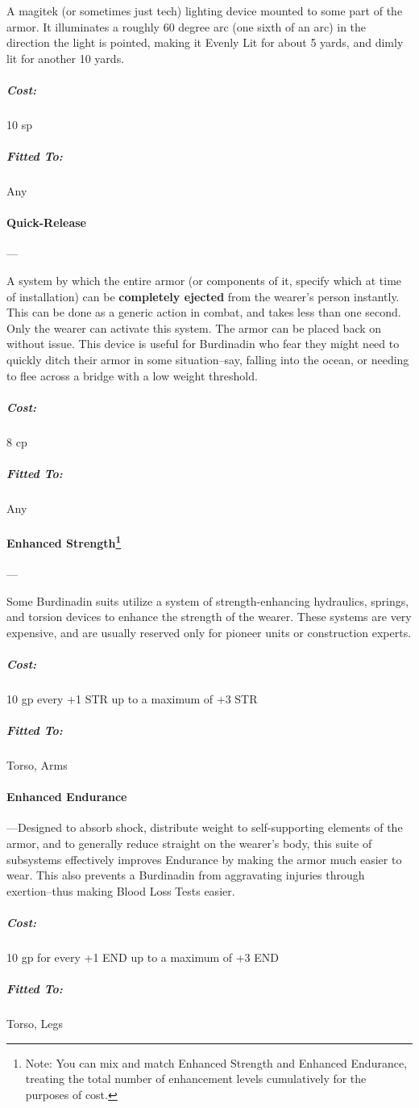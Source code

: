 \documentclass[oneside,11pt,english]{book}
\begin{document}
A magitek (or sometimes just tech) lighting device mounted to some part of the armor. It illuminates a 
roughly 60 degree arc (one sixth of an arc) in the direction the light is pointed, making it Evenly Lit for 
about 5 yards, and dimly lit for another 10 yards. 
\vspace{-15pt}\subparagraph{Cost:} 10 sp
\vspace{-15pt}\subparagraph{Fitted To:} Any

\paragraph{Quick-Release}---\quad[0]

A system by which the entire armor (or components of it, specify which at time of installation) can be 
\textbf{completely ejected} from the wearer’s person instantly. This can be done as a generic action in combat, 
and takes less than one second. Only the wearer can activate this system. The armor can be placed back 
on without issue. This device is useful for Burdinadin who fear they might need to quickly ditch their 
armor in some situation--say, falling into the ocean, or needing to flee across a bridge with a low weight threshold.
\vspace{-15pt}\subparagraph{Cost:} 8 cp
\vspace{-15pt}\subparagraph{Fitted To:} Any

\paragraph[Enhanced Strength]{Enhanced Strength\footnote{Note: You can mix and match Enhanced Strength and Enhanced Endurance, treating the total number of enhancement levels cumulatively for the purposes of cost.} }---

Some Burdinadin suits utilize a system of strength-enhancing hydraulics, springs, and torsion devices to 
enhance the strength of the wearer. These systems are very expensive, and are usually reserved only for 
pioneer units or construction experts. 
\vspace{-15pt}\subparagraph{Cost:} 10 gp every +1 STR up to a maximum of +3 STR 
\vspace{-15pt}\subparagraph{Fitted To:} Torso, Arms

\paragraph[Enhanced Endurance]{Enhanced Endurance\footnotemark[\value{footnote}] }--- 
Designed to absorb shock, distribute weight to self-supporting elements of the armor, and to generally 
reduce straight on the wearer’s body, this suite of subsystems effectively improves Endurance by making 
the armor much easier to wear. This also prevents a Burdinadin from aggravating injuries through 
exertion--thus making Blood Loss Tests easier. 
\vspace{-15pt}\subparagraph{Cost:} 10 gp for every +1 END up to a maximum of +3 END 
\vspace{-15pt}\subparagraph{Fitted To:} Torso, Legs 
\end{document}

